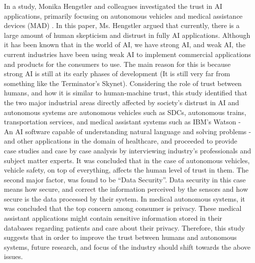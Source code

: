 \documentclass[runningheads,a4paper]{llncs}
\begin{document}
In a study, Monika Hengstler and colleagues investigated the trust in AI applications, primarily focusing on autonomous vehicles and medical assistance devices (MAD) \cite{hengstler2016applied}. In this paper, Ms. Hengstler argued that currently, there is a large amount of human skepticism and distrust in fully AI applications. Although it has been known that in the world of AI, we have strong AI, and weak AI, the current industries have been using weak AI to implement commercial applications and products for the consumers to use. The main reason for this is because strong AI is still at its early phases of development (It is still very far from something like the Terminator's Skynet). Considering the role of trust between humans, and how it is similar to human-machine trust, this study identified that the two major industrial areas directly affected by society's distrust in AI and autonomous systems are autonomous vehicles such as SDCs, autonomous trains, transportation services, and medical assistant systems such as IBM's Watson - An AI software capable of understanding natural language and solving problems - and other applications in the domain of healthcare, and proceeded to provide case studies and case by case analysis by interviewing industry's professionals and subject matter experts. It was concluded that in the case of autonomous vehicles, vehicle safety, on top of everything, affects the human level of trust in them. The second major factor, was found to be ``Data Security''. Data security in this case means how secure, and correct the information perceived by the sensors and how secure is the data processed by their system. In medical autonomous systems, it was concluded that the top concern among consumer is privacy. These medical assistant applications might contain sensitive information stored in their databases regarding patients and care about their privacy. Therefore, this study suggests that in order to improve the trust between humans and autonomous systems, future research, and focus of the industry should shift towards the above issues.
\end{document}
